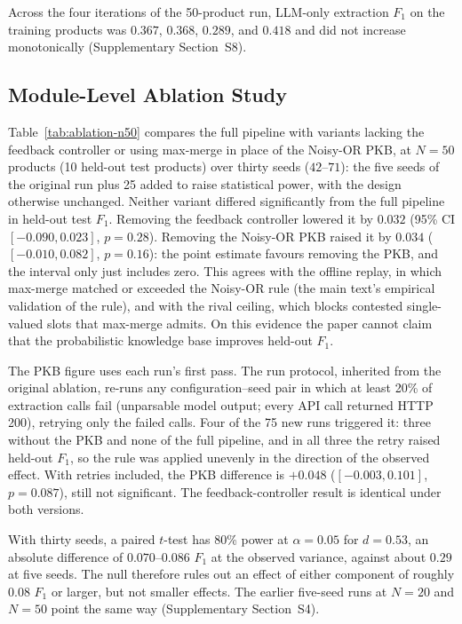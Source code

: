 \documentclass[11pt]{article}
\begin{document}
Across the four iterations of the 50-product run, LLM-only extraction
$F_1$ on the training products was $0.367$, $0.368$, $0.289$, and $0.418$
and did not increase monotonically (Supplementary Section~S8).

\subsection{Module-Level Ablation Study}
\label{sec:results-ablation}

Table~\ref{tab:ablation-n50} compares the full pipeline with variants
lacking the feedback controller or using max-merge in place of the
Noisy-OR PKB, at $N=50$ products (10 held-out test products) over thirty
seeds ($42$--$71$): the five seeds of the original run plus 25 added to
raise statistical power, with the design otherwise unchanged.
Neither variant differed significantly from the full pipeline in
held-out test $F_1$. Removing the feedback controller lowered it by
$0.032$ (95\% CI $[-0.090, 0.023]$, $p=0.28$). Removing the Noisy-OR PKB
raised it by $0.034$ ($[-0.010, 0.082]$, $p=0.16$): the point estimate
favours removing the PKB, and the interval only just includes zero. This
agrees with the offline replay, in which max-merge matched or exceeded
the Noisy-OR rule (the main text's empirical validation of the rule), and with
the rival ceiling, which blocks contested single-valued slots that
max-merge admits. On this evidence the paper cannot claim that the
probabilistic knowledge base improves held-out $F_1$.

The PKB figure uses each run's first pass. The run protocol, inherited
from the original ablation, re-runs any configuration--seed pair in which
at least 20\% of extraction calls fail (unparsable model output; every
API call returned HTTP 200), retrying only the failed calls. Four of the
75 new runs triggered it: three without the PKB and none of the full
pipeline, and in all three the retry raised held-out $F_1$, so the rule
was applied unevenly in the direction of the observed effect. With
retries included, the PKB difference is $+0.048$ ($[-0.003, 0.101]$,
$p=0.087$), still not significant. The feedback-controller result is
identical under both versions.

With thirty seeds, a paired $t$-test has 80\% power at $\alpha=0.05$ for
$d=0.53$, an absolute difference of $0.070$--$0.086$ $F_1$ at the
observed variance, against about $0.29$ at five seeds. The null
therefore rules out an effect of either component of roughly $0.08$
$F_1$ or larger, but not smaller effects. The earlier
five-seed runs at $N=20$ and $N=50$ point the same way (Supplementary
Section~S4).
\end{document}
